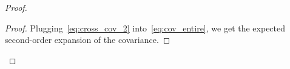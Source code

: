 \documentclass[11pt]{article}
\newcommand{\eqdef}{\coloneqq}
\newcommand{\cov}{\operatorname{Cov}}
\begin{document}
\begin{proof}
\begin{proof}
Plugging~\eqref{eq:cross_cov_2} into~\eqref{eq:cov_entire}, we get the expected second-order expansion of the covariance. 

\end{proof}


\end{proof}
\end{document}
